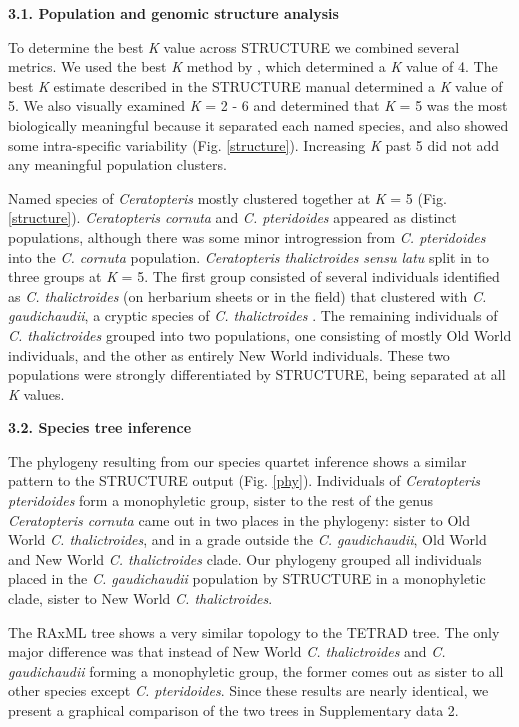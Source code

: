 \documentclass[12pt]{article}
\begin{document}
\begin{flushleft}
\textbf{3.1. Population and genomic structure analysis}

To determine the best \textit{K} value across {\small{STRUCTURE}} we combined several metrics. We used the best \textit{K} method by \textcite{Evanno2005}, which determined a \textit{K} value of 4. The best \textit{K} estimate described in the {\small{STRUCTURE}} manual \autocite{Pritchard2000} determined a \textit{K} value of 5. We also visually examined \textit{K} = 2 - 6 and determined that \textit{K} = 5 was the most biologically meaningful because it separated each named species, and also showed some intra-specific variability (Fig. \ref{structure}). Increasing \textit{K} past 5 did not add any meaningful population clusters. 

Named species of \textit{Ceratopteris} mostly clustered together at \textit{K} = 5 (Fig. \ref{structure}). \textit{Ceratopteris cornuta} and \textit{C. pteridoides} appeared as distinct populations, although there was some minor introgression from \textit{C. pteridoides} into the \textit{C. cornuta} population. \textit{Ceratopteris thalictroides} \textit{sensu latu} split in to three groups at \textit{K} = 5. The first group consisted of several individuals identified as \textit{C. thalictroides} (on herbarium sheets or in the field) that clustered with \textit{C. gaudichaudii}, a cryptic species of \textit{C. thalictroides} \autocite{Masuyama2010}. The remaining individuals of \textit{C. thalictroides} grouped into two populations, one consisting of mostly Old World individuals, and the other as entirely New World individuals. These two populations were strongly differentiated by {\small{STRUCTURE}}, being separated at all \textit{K} values.

\textbf{3.2. Species tree inference}

 The phylogeny resulting from our species quartet inference shows a similar pattern to the {\small{STRUCTURE}} output (Fig. \ref{phy}). Individuals of \textit{Ceratopteris pteridoides} form a monophyletic group, sister to the rest of the genus \textit{Ceratopteris cornuta} came out in two places in the phylogeny: sister to Old World \textit{C. thalictroides}, and in a grade outside the \textit{C. gaudichaudii}, Old World and New World \textit{C. thalictroides} clade. Our phylogeny grouped all individuals placed in the \textit{C. gaudichaudii} population by {\small{STRUCTURE}} in a monophyletic clade, sister to New World \textit{C. thalictroides}. 
 
 The {\small{RAxML}} tree shows a very similar topology to the {\small{TETRAD}} tree. The only major difference was that instead of New World \textit{C. thalictroides} and \textit{C. gaudichaudii} forming a monophyletic group, the former comes out as sister to all other species except \textit{C. pteridoides}. Since these results are nearly identical, we present a graphical comparison of the two trees in Supplementary data 2.  


\end{flushleft}
\end{document}
